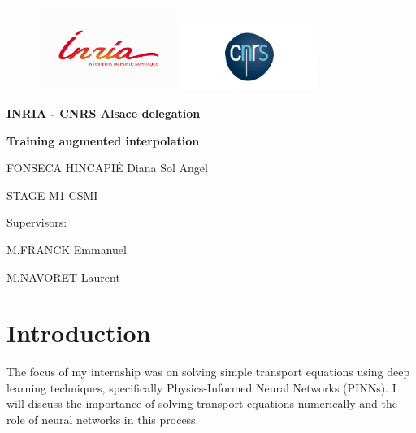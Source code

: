 \documentclass{article}
\begin{document}
\begin{titlepage}
\begin{figure} 
\includegraphics[width=0.4\textwidth]{images/inria.png}
\includegraphics[width=0.4\textwidth]{images/cnrslogo.jpeg}
    \centering
\end{figure}

\centering
\title{}\author{}\date{}
\centering
\vspace{3cm}
{\bfseries\LARGE INRIA - CNRS Alsace delegation\par}
\vspace{4cm}
{\bfseries\LARGE Training augmented interpolation \par}
\vspace{1cm}
{\Large FONSECA HINCAPIÉ Diana Sol Angel\par}
\vspace{1cm}
{\Large STAGE M1 CSMI \par}
\vspace{3cm}
{\Large Supervisors: \par}
\vspace{0.5cm}
{\Large M.FRANCK Emmanuel\par}
\vspace{0.5cm}
{\Large M.NAVORET Laurent\par}
\end{titlepage}


\maketitle
\tableofcontents 
\newpage



\section{Introduction}
The focus of my internship was on solving simple transport equations using deep learning techniques, specifically Physics-Informed Neural Networks (PINNs). I will discuss the importance of solving transport equations numerically and the role of neural networks in this process.
\end{document}
